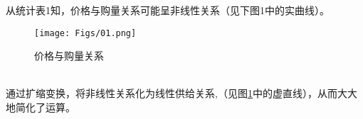 \indent{}从统计表1知，价格与购量关系可能呈非线性关系（见下图1中的实曲线）。
\begin{figure}[!h]
\centering
 \texttt{[image: Figs/01.png]}
\caption{价格与购量关系}
\label{fig:01}
\end{figure}
\\\indent{}通过扩缩变换，将非线性关系化为线性供给关系,（见图\ref{fig:01}中的虚直线），从而大大地简化了运算。
